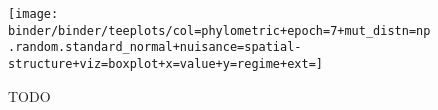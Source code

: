 \begin{figure*}
  \centering
  \texttt{[image: binder/binder/teeplots/col=phylometric+epoch=7+mut\_distn=np.random.standard\_normal+nuisance=spatial-structure+viz=boxplot+x=value+y=regime+ext=]}
  \caption{TODO}
  \label{fig:perfect-tree-phylometrics-with-spatial-nuisance}
\end{figure*}
